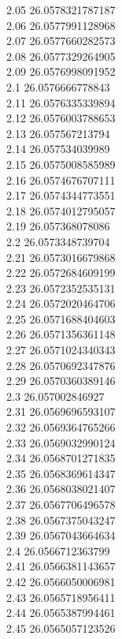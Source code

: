 {2.05	26.0578321787187\\
2.06	26.0577991128968\\
2.07	26.0577660282573\\
2.08	26.0577329264905\\
2.09	26.0576998091952\\
2.1	26.0576666778843\\
2.11	26.0576335339894\\
2.12	26.0576003788653\\
2.13	26.057567213794\\
2.14	26.057534039989\\
2.15	26.0575008585989\\
2.16	26.0574676707111\\
2.17	26.0574344773551\\
2.18	26.0574012795057\\
2.19	26.057368078086\\
2.2	26.0573348739704\\
2.21	26.0573016679868\\
2.22	26.0572684609199\\
2.23	26.0572352535131\\
2.24	26.0572020464706\\
2.25	26.0571688404603\\
2.26	26.0571356361148\\
2.27	26.0571024340343\\
2.28	26.0570692347876\\
2.29	26.0570360389146\\
2.3	26.057002846927\\
2.31	26.0569696593107\\
2.32	26.0569364765266\\
2.33	26.0569032990124\\
2.34	26.0568701271835\\
2.35	26.0568369614347\\
2.36	26.0568038021407\\
2.37	26.0567706496578\\
2.38	26.0567375043247\\
2.39	26.0567043664634\\
2.4	26.0566712363799\\
2.41	26.0566381143657\\
2.42	26.0566050006981\\
2.43	26.0565718956411\\
2.44	26.0565387994461\\
2.45	26.0565057123526\\
}

